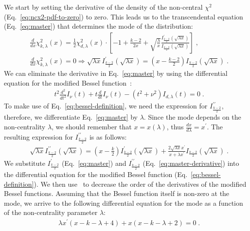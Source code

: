 \documentclass[final,5p,twocolumn,times,authoryear]{elsarticle}
\begin{document}
We start by setting the derivative of the density of the non-central $\chi^2$ (Eq.~\ref{eq:ncx2-pdf-to-zero}) to zero. This leads us to the transcendental equation (Eq.~\ref{eq:master}) that determines the mode of the distribution:
%
\begin{align}
    &\frac{d}{dx} \chi^2_{k, \lambda}(x) = \frac{1}{2} \chi^2_{d, \lambda}(x) \cdot \left[ -1 + \frac{k-2}{2 x} + \sqrt{\frac{\lambda}{x}}\frac{I^{\prime}_{\frac{k-2}{2}}(\sqrt{\lambda x})}{I_{\frac{k-2}{2}}(\sqrt{\lambda x})} \right]\label{eq:ncx2-pdf-to-zero}\;, \\
    &\frac{d}{dx} \chi^2_{k, \lambda}(x) = 0 \Rightarrow \sqrt{\lambda x} I^{\prime}_{\frac{k-2}{2}}(\sqrt{\lambda x}) = (x - \frac{k-2}{2}) I_{\frac{k-2}{2}}(\sqrt{\lambda x})\label{eq:master}\;.
\end{align}
%
We can eliminate the derivative in Eq.~\ref{eq:master} by using the differential equation for the modified Bessel function~\cite[Eq.~10.25.1]{NIST:DLMF}:
%
\begin{align}
    &t^2 \frac{d^2}{dt^2} I_{\nu}(t) + t \frac{d}{dt} I_{\nu}(t) - (t^2 + \nu^2) I_{d, \lambda}(t) = 0 \label{eq:bessel-definition}\;.
\end{align}
%
To make use of Eq.~\ref{eq:bessel-definition}, we need the expression for $I^{\prime \prime}_{\frac{k-2}{2}}$, therefore, we differentiate Eq.~\ref{eq:master} by $\lambda$. Since the mode depends on the non-centrality $\lambda$, we should remember that $x = x(\lambda)$, thus $\frac{dx}{d\lambda} = x^{\prime}$. The resulting expression for $I^{\prime \prime}_{\frac{k-2}{2}}$ is as follows:
%
\begin{align}
    &\sqrt{\lambda x} I^{\prime \prime}_{\frac{k-2}{2}} (\sqrt{\lambda x}) =
    (x - \frac{k}{2}) I^{\prime}_{\frac{k-2}{2}}(\sqrt{\lambda x}) +  \frac{2 \sqrt{\lambda x} x^{\prime}}{x + \lambda x^\prime} I_{\frac{k-2}{2}}(\sqrt{\lambda x})\label{eq:master-derivative}\;.
\end{align}
%
We substitute $I^{\prime}_{\frac{k-2}{2}}$ (Eq.~\ref{eq:master}) and $I^{\prime \prime}_{\frac{k-2}{2}}$ (Eq.~\ref{eq:master-derivative}) into the differential equation for the modified Bessel function (Eq.~\ref{eq:bessel-definition}). We then use~\cite[Eq.~10.29.4]{NIST:DLMF} to decrease the order of the derivatives of the modified Bessel functions. Assuming that the Bessel function itself is non-zero at the mode, we arrive to the following differential equation for the mode as a function of the non-centrality parameter $\lambda$:
%
\begin{align}
    &\lambda x^{\prime} (x - k - \lambda + 4) + x (x - k - \lambda + 2) = 0\;.\label{eq:master-ode}
\end{align}
%
\end{document}
